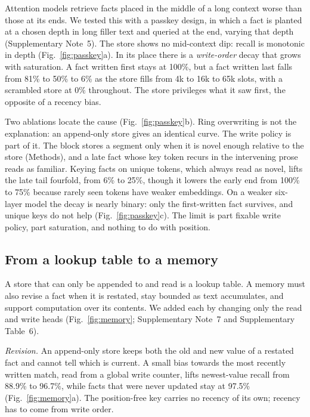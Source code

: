 Attention models retrieve facts placed in the middle of a long context worse than those at
its ends\cite{liu2024lost}. We tested this with a passkey design\cite{mohtashami2023landmark}, in which a fact is planted at a chosen depth in long filler text and queried at the end, varying that depth (Supplementary Note~5). The store shows no mid-context dip:
recall is monotonic in depth (Fig.~\ref{fig:passkey}a). In its place there is a \emph{write-order}
decay that grows with saturation. A fact written first stays at 100\%, but a fact
written last falls from 81\% to 50\% to 6\% as the store fills from 4k to 16k to 65k slots,
with a scrambled store at $0\%$ throughout. The store privileges what it saw first, the
opposite of a recency bias.

Two ablations locate the cause (Fig.~\ref{fig:passkey}b). Ring overwriting is not the
explanation: an append-only store gives an identical curve. The write policy is part of it. The block stores a
segment only when it is novel enough relative to the store (Methods), and a late fact whose
key token recurs in the intervening prose reads as familiar. Keying facts on unique tokens,
which always read as novel, lifts the late tail fourfold, from 6\% to 25\%, though it lowers
the early end from 100\% to 75\% because rarely seen tokens have weaker embeddings. On a
weaker six-layer model the decay is nearly binary: only the first-written fact survives,
and unique keys do not help (Fig.~\ref{fig:passkey}c). The limit is part fixable write
policy, part saturation, and nothing to do with position.

\subsection*{From a lookup table to a memory}

A store that can only be appended to and read is a lookup table. A memory must also revise a
fact when it is restated, stay bounded as text accumulates, and support computation over its
contents. We added each by changing only the read and write heads (Fig.~\ref{fig:memory}; Supplementary Note~7 and Supplementary Table~6).

\emph{Revision.} An append-only store keeps both the old and new value of a restated fact and
cannot tell which is current. A small bias towards the most recently written match, read from
a global write counter, lifts newest-value recall from 88.9\% to 96.7\%, while facts that were never updated stay at 97.5\% (Fig.~\ref{fig:memory}a). The
position-free key carries no recency of its own; recency has to come from write order.

